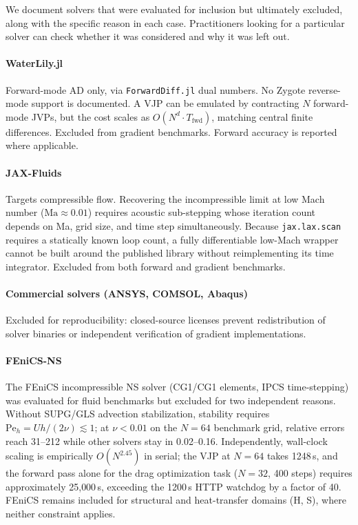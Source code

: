 \documentclass[11pt,a4paper]{article}
\begin{document}
We document solvers that were evaluated for inclusion but ultimately
excluded, along with the specific reason in each case. Practitioners
looking for a particular solver can check whether it was considered and
why it was left out.

\paragraph{WaterLily.jl~\cite{waterlily2024}}
Forward-mode AD only, via \texttt{ForwardDiff.jl} dual numbers. No
Zygote reverse-mode support is documented. A VJP can be emulated by
contracting $N$ forward-mode JVPs, but the cost scales as
$O(N^d \cdot T_{\mathrm{fwd}})$, matching central finite differences.
Excluded from gradient benchmarks. Forward accuracy is reported where
applicable.

\paragraph{JAX-Fluids~\cite{jaxfluids2022}}
Targets compressible flow. Recovering the incompressible limit at low Mach
number ($\mathrm{Ma} \approx 0.01$) requires acoustic sub-stepping whose
iteration count depends on Ma, grid size, and time step simultaneously.
Because \texttt{jax.lax.scan} requires a statically known loop count, a
fully differentiable low-Mach wrapper cannot be built around the published
library without reimplementing its time integrator. Excluded from both
forward and gradient benchmarks.

\paragraph{Commercial solvers (ANSYS, COMSOL, Abaqus)}
Excluded for reproducibility: closed-source licenses prevent redistribution
of solver binaries or independent verification of gradient implementations.

\paragraph{FEniCS-NS~\cite{farrell2013automated}}
The FEniCS incompressible NS solver (CG1/CG1 elements, IPCS time-stepping)
was evaluated for fluid benchmarks but excluded for two independent reasons.
Without SUPG/GLS advection stabilization, stability requires
$\mathrm{Pe}_h = Uh/(2\nu) \lesssim 1$; at $\nu < 0.01$ on the $N=64$
benchmark grid, relative errors reach 31--212 while other solvers stay in
0.02--0.16.
Independently, wall-clock scaling is empirically $O(N^{2.45})$ in serial;
the VJP at $N=64$ takes 1248\,s, and the forward pass alone for the drag
optimization task ($N=32$, 400 steps) requires approximately 25{,}000\,s,
exceeding the 1200\,s HTTP watchdog by a factor of 40.
FEniCS remains included for structural and heat-transfer domains (H, S),
where neither constraint applies.
\end{document}
